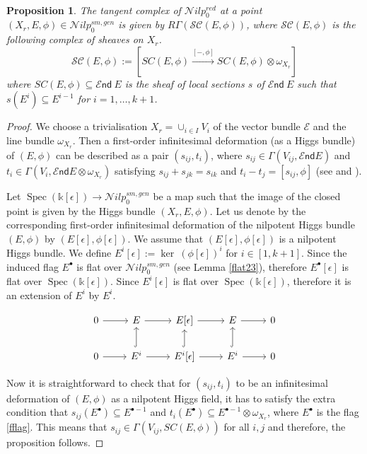 \documentclass[11pt]{amsart}
\newcommand {\End} {\mathcal E\mathsf{nd}}
\DeclareMathOperator{\Spec}{Spec}
\theoremstyle{plain}
\numberwithin{equation}{section}
\theoremstyle{definition}
\theoremstyle{plain}
\newtheorem{Prop}[Def]{Proposition}
\begin{document}
\

\begin{Prop}\label{DefCom}
The tangent complex of $\mathcal Nilp^{red}_{0}$ at a point $(X_r,  E, \phi)\in \mathcal Nilp^{sm, gen}_0$ is given by $R\Gamma(\mathcal {SC}{( E, \phi)})$, where $\mathcal {SC}{(E, \phi)}$ is the following complex of sheaves on $X_r$.
\begin{equation}\label{above}
\mathcal {SC}{(E, \phi)}:=[SC(E,\phi)\xrightarrow{[-, \phi]} SC(E,\phi)\otimes \omega_{X_r}]
\end{equation}
where $SC(E, \phi)\subseteq \End~E$ is the sheaf of local sections $s$ of $\End~E$ such that $s(E^i)\subseteq E^{i-1}$ for $i=1,\dots, k+1$.
\end{Prop}
\begin{proof}
We choose a trivialisation $X_r=\cup_{i\in I} V_i$ of the vector bundle $\mathcal E$ and the line bundle $\omega_{X_r}$. Then a first-order infinitesimal deformation (as a Higgs bundle) of $( E, \phi)$ can be described as a pair $(s_{ij}, t_i)$, where $s_{ij}\in \Gamma(V_{ij}, \End E)$ and $t_i\in \Gamma(V_i, \End E\otimes \omega_{X_r})$ satisfying $s_{ij}+s_{jk}=s_{ik}$ and $t_i-t_j=[s_{ij}, \phi]$ (see \cite[Theorem 2.3]{BR} and \cite[Proposition 3.1.2]{Bo}).

Let $\Spec (\mathbb k[\epsilon]) \longrightarrow \mathcal Nilp^{sm, gen}_0$ be a map such that the image of the closed point is given by the Higgs bundle $(X_r, E, \phi)$. Let us denote by the corresponding first-order infinitesimal deformation of the nilpotent Higgs bundle $(E, \phi)$ by $(E[\epsilon], \phi[\epsilon])$. We assume that $(E[\epsilon], \phi[\epsilon])$ is a nilpotent Higgs bundle. We define $ E^i[\epsilon]:=\ker~(\phi[\epsilon])^i$ for $i\in [1, k+1]$. Since the induced flag $E^{\bullet}$ is flat over $\mathcal Nilp^{sm, gen}_0$ (see Lemma \ref{flat23}), therefore $ E^{\bullet}[\epsilon]$ is flat over $\Spec(\mathbb k[\epsilon])$. Since $E^{i}[\epsilon]$ is flat over $\Spec(\mathbb k[\epsilon])$, therefore it is an extension of $E^i$ by $E^i$.  

\begin{equation}
    \begin{tikzcd}
        0\rar & E \rar & E[\epsilon] \rar & E \rar & 0\\
        0\rar & E^i \rar \arrow[hook]{u} & E^i[\epsilon] \rar \arrow[hook]{u} & E^i \rar \arrow[hook]{u} & 0
    \end{tikzcd}
\end{equation}
\vspace{.6em}

Now it is straightforward to check that for $(s_{ij}, t_i)$ to be an infinitesimal deformation of $(E, \phi)$ as a nilpotent Higgs field, it has to satisfy the extra condition that  $s_{ij}(E^{\bullet})\subseteq E^{\bullet-1}$ and $t_{i}(E^{\bullet})\subseteq E^{\bullet-1}\otimes \omega_{X_r}$, where $ E^{\bullet}$ is the flag \eqref{fflag}. This means that $s_{ij}\in \Gamma(V_{ij}, SC(E, \phi))$ for all $i,j$ and therefore, the proposition follows.
\end{proof}
\end{document}
